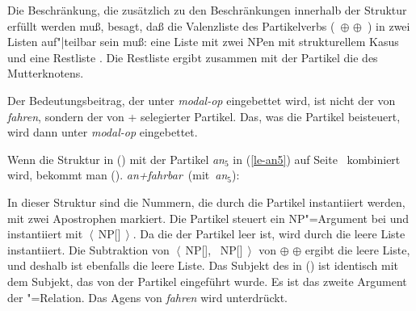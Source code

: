 \noindent
Die Beschränkung, die zusätzlich zu den Beschränkungen innerhalb der Struktur erfüllt werden muß,
besagt, daß die Valenzliste des Partikelverbs (\, $\oplus$  $\oplus$ \,) 
in zwei Listen auf"|teilbar sein muß: eine Liste mit zwei NPen mit strukturellem Kasus und eine
Restliste . Die Restliste ergibt zusammen mit der Partikel die \subcatl des Mutterknotens.

Der Bedeutungsbeitrag, der unter \emph{modal-op} eingebettet wird, ist nicht
der von \emph{fahren}, sondern der von  + selegierter Partikel. Das, was
die Partikel beisteuert, wird dann unter \emph{modal-op} eingebettet.

Wenn die Struktur in () mit der Partikel {\em an$_5$\/} in (\ref{le-an5}) auf Seite~\pageref{le-an5}
kombiniert wird, bekommt man ().
\eas
\label{le-anfahrbar}
\mbox{{\em an+fahrbar\/} (mit {\em an$_5$\/}):}\\
\zs
%

\noindent
In dieser Struktur sind die Nummern, die durch die Partikel instantiiert werden, mit zwei Apostrophen markiert.
Die Partikel steuert ein NP"=Argument bei und instantiiert  mit 
$\left\langle\right.$\,NP[\str]\,$\left.\right\rangle$.
Da die \subcatl der Partikel leer ist, wird  durch die leere Liste instantiiert. 
Die Subtraktion von $\left\langle\right.$\,NP[\str], ~NP[\str]\,$\left.\right\rangle$ von
 $\oplus$  $\oplus$  ergibt die leere Liste, und deshalb ist
 ebenfalls die leere Liste. Das Subjekt des \baradjs in () ist identisch
mit dem Subjekt, das von der Partikel eingeführt wurde. Es ist das zweite Argument der
"=Relation. Das Agens von \emph{fahren} wird unterdrückt.
\iw{\bars|)}

